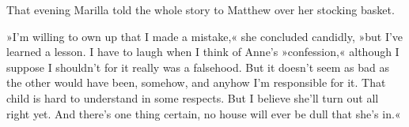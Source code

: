 That evening Marilla told the whole story to Matthew over her stocking basket.

»I’m willing to own up that I made a mistake,« she concluded candidly, »but I’ve learned a lesson. I have to laugh when I think of Anne’s »confession,« although I suppose I shouldn’t for it really was a falsehood. But it doesn’t seem as bad as the other would have been, somehow, and anyhow I’m responsible for it. That child is hard to understand in some respects. But I believe she’ll turn out all right yet. And there’s one thing certain, no house will ever be dull that she’s in.«